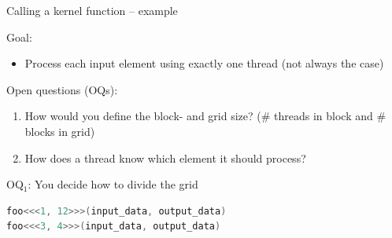 \documentclass[11pt,t]{beamer}
\begin{document}
\begin{frame}{Calling a kernel function -- example} 

    \vspace{0.5 em}
    Goal:
    \begin{small}
    \begin{itemize}
        \item Process each input element using exactly one thread {\footnotesize (not always the case)}
    \end{itemize}
    \end{small}
    
    \vspace{0.5 em}
    
    Open questions (OQs):
    \begin{small}
    \begin{enumerate}
        \item How would you define the block- and grid size? {\footnotesize (\# threads in block and \# blocks in grid)}
        \item How does a thread know which element it should process?
    \end{enumerate}
    \end{small}
    
    \vspace{0.5 em}
    
    \begin{figure}[t]
        \centering
        \begin{center}               
            \resizebox{0.8\columnwidth}{!}{}
        \end{center}
    \end{figure}

\end{frame}



\begin{frame}[fragile]{OQ$_\text{1}$: You decide how to divide the grid} 

\begin{lstlisting}[language=C++]
foo<<<1, 12>>>(input_data, output_data)
foo<<<3, 4>>>(input_data, output_data)
\end{lstlisting}

\begin{figure}[t]
    \centering
    \begin{center}               
        \resizebox{0.8\columnwidth}{!}{}
    \end{center}
\end{figure}

\end{frame}
\end{document}
